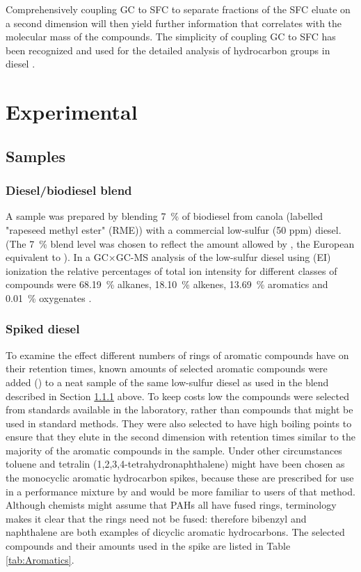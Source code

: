 Comprehensively coupling GC to SFC to separate fractions of the SFC eluate on a
second dimension will then yield further information that correlates with the
molecular mass of the compounds. The simplicity of coupling GC to SFC has been
recognized and used for the detailed analysis of hydrocarbon groups in diesel
\autocite{Pal1998}.


\section{Experimental}

\subsection{Samples} 

\subsubsection{Diesel/biodiesel blend}
\label{sec:SampleBlend}
A sample was prepared by blending \SI{7}{\percent} of biodiesel from canola
(labelled "rapeseed methyl ester" (RME)) with a commercial low-sulfur (50 ppm)
diesel. (The \SI{7}{\percent} blend level was chosen to reflect the amount
allowed by , the European equivalent to ). In a GC×GC-MS
analysis of the low-sulfur diesel using  (EI)
ionization the relative percentages of total ion intensity for different classes
of compounds were \SI{68.19}{\percent} alkanes, \SI{18.10}{\percent} alkenes,
\SI{13.69}{\percent} aromatics and \SI{0.01}{\percent} oxygenates
\autocite{Smit2015}.

\subsubsection{Spiked diesel}
To examine the effect different numbers of rings of aromatic compounds have on
their retention times, known amounts of selected aromatic compounds were added
() to a neat sample of the same low-sulfur diesel as used in the
blend described in Section \ref{sec:SampleBlend} above. To keep costs low the
compounds were selected from standards available in the laboratory, rather than
compounds that might be used in standard methods. They were also selected to
have high boiling points to ensure that they elute in the second dimension with
retention times similar to the majority of the aromatic compounds in the sample.
Under other circumstances toluene and tetralin (1,2,3,4-tetrahydronaphthalene)
might have been chosen as the monocyclic aromatic hydrocarbon spikes, because
these are prescribed for use in a performance mixture by  and
would be more familiar to users of that method. Although chemists might assume
that PAHs all have fused rings,  terminology makes it clear that
the rings need not be fused: therefore bibenzyl and naphthalene are both
examples of dicyclic aromatic hydrocarbons. The selected compounds and their
amounts used in the spike are listed in Table \ref{tab:Aromatics}.

